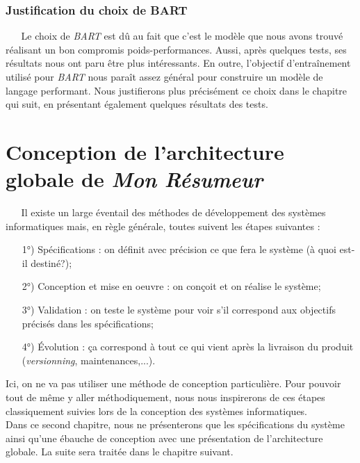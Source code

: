 \subsubsection{Justification du choix de BART}
$ _{} $ $ _{} $ $ _{} $ $ _{} $ $ _{} $Le choix de \textit{BART} est dû au fait que c'est le modèle que nous avons trouvé réalisant un bon compromis poids-performances. Aussi, après quelques tests, ses résultats nous ont paru être plus intéressants. En outre, l'objectif d'entraînement utilisé pour \textit{BART} nous paraît assez général pour construire un modèle de langage performant. Nous justifierons plus précisément ce choix dans le chapitre qui suit, en présentant également quelques résultats des tests.
\section{Conception de l'architecture globale de \textit{Mon Résumeur}}
$ _{} $ $ _{} $ $ _{} $ $ _{} $ $ _{} $Il existe un large éventail des méthodes de développement des systèmes informatiques mais, en règle générale, toutes suivent les étapes suivantes \cite{CoursGenieLogiciel} :
\begin{itemize}
\item[1°)] Spécifications : on définit avec précision ce que fera le système (à quoi est-il destiné?);
\item[2°)] Conception et mise en oeuvre : on conçoit et on réalise le système;
\item[3°)] Validation : on teste le système pour voir s'il correspond aux objectifs précisés dans les spécifications;
\item[4°)] Évolution : ça correspond à tout ce qui vient après la livraison du produit (\textit{versionning}, maintenances,...).
\end{itemize}
Ici, on ne va pas utiliser une méthode de conception particulière. Pour pouvoir tout de même y aller méthodiquement, nous nous inspirerons de ces étapes classiquement suivies lors de la conception des systèmes informatiques.\\
Dans ce second chapitre, nous ne présenterons que les spécifications du système ainsi qu'une ébauche de conception avec une présentation de l'architecture globale. La suite sera traitée dans le chapitre suivant.
